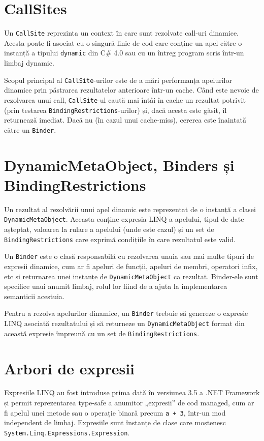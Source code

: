 \documentclass[12pt,a4paper]{memoir}
\renewcommand{\c}{\texttt}
\begin{document}
\section{CallSites}

Un \c{CallSite} reprezinta un context în care sunt rezolvate call-uri dinamice. Acesta poate fi asociat cu o singură linie de cod care conține un apel către o instanță a tipului \c{dynamic} din C\# 4.0\cite{csharp_4_specs} sau cu un întreg program scris într-un limbaj dynamic. 

Scopul principal al \c{CallSite}-urilor este de a mări performanța apelurilor dinamice prin păstrarea rezultatelor anterioare într-un cache. Când este nevoie de rezolvarea unui call, \c{CallSite}-ul caută mai întâi în cache un rezultat potrivit (prin testarea \c{BindingRestrictions}-urilor) și, dacă acesta este găsit, îl returnează imediat. Dacă nu (în cazul unui cache-miss), cererea este înaintată către un \c{Binder}.

\section{DynamicMetaObject, Binders și BindingRestrictions}

Un rezultat al rezolvării unui apel dinamic este reprezentat de o instanță a clasei \c{DynamicMetaObject}\cite{dynamic_meta_object}. Aceasta conține expresia LINQ\cite{linq_expressions} a apelului, tipul de date așteptat, valoarea la rulare a apelului (unde este cazul) și un set de \c{BindingRestrictions} care exprimă condițiile în care rezultatul este valid.

Un \c{Binder} este o clasă responsabilă cu rezolvarea unuia sau mai multe tipuri de expresii dinamice, cum ar fi apeluri de funcții, apeluri de membri, operatori infix, etc și returnarea unei instanțe de \c{DynamicMetaObject} ca rezultat. Binder-ele sunt specifice unui anumit limbaj, rolul lor fiind de a ajuta la implementarea semanticii acestuia.

Pentru a rezolva apelurilor dinamice, un \c{Binder} trebuie să genereze o expresie LINQ asociată rezultatului și să returneze un \c{DynamicMetaObject} format din această expresie împreună cu un set de \c{BindingRestrictions}.

\section{Arbori de expresii}

Expresiile LINQ au fost introduse prima dată în versiunea 3.5 a .NET Framework\cite{expression_trees_35} și permit reprezentarea type-safe a anumitor „expresii” de cod managed, cum ar fi apelul unei metode sau o operație binară precum \c{a + 3}, într-un mod independent de limbaj. Expresiile sunt înstanțe de clase care moștenesc \c{System.Linq.Expressions.Expression}.
\end{document}

